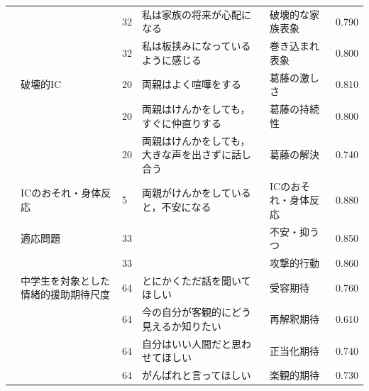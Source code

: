 \begin{landscape}
\begin{longtable}{p{2cm}p{2cm}p{2cm}p{6cm}p{2cm}p{2cm}}
		                         &                                  & 32  & 私は家族の将来が心配になる                                       & 破壊的な家族表象             & 0.790      \\
		                         &                                  & 32  & 私は板挟みになっているように感じる                                   & 巻き込まれ表象              & 0.800      \\
		                         & 破壊的IC                            & 20  & 両親はよく喧嘩をする                                          & 葛藤の激しさ               & 0.810      \\
		                         &                                  & 20  & 両親はけんかをしても，すぐに仲直りする                                 & 葛藤の持続性               & 0.800      \\
		                         &                                  & 20  & 両親はけんかをしても，大きな声を出さずに話し合う                            & 葛藤の解決                & 0.740      \\
		                         & ICのおそれ・身体反応                      & 5   & 両親がけんかをしていると，不安になる                                  & ICのおそれ・身体反応          & 0.880      \\
		                         & 適応問題                             & 33  &                                                     & 不安・抑うつ               & 0.850      \\
		                         &                                  & 33  &                                                     & 攻撃的行動                & 0.860      \\
		\textcite{Amai202192}       & 中学生を対象とした情緒的援助期待尺度               & 64  & とにかくただ話を聞いてほしい                                      & 受容期待                 & 0.760      \\
		                         &                                  & 64  & 今の自分が客観的にどう見えるか知りたい                                 & 再解釈期待                & 0.610      \\
		                         &                                  & 64  & 自分はいい人間だと思わせてほしい                                    & 正当化期待                & 0.740      \\
		                         &                                  & 64  & がんばれと言ってほしい                                         & 楽観的期待                & 0.730      \\

\end{longtable}
\end{landscape}
